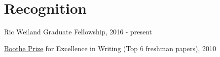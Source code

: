 \documentclass[letterpaper]{article}
\def\footerlink{}
\renewenvironment{itemize}{
  \begin{list}{}{
    \setlength{\leftmargin}{1.5em}
  }
}{
  \end{list}
}
\begin{document}
\section*{Recognition}
\begin{itemize}
\item Ric Weiland Graduate Fellowship, 2016 - present
\item \href{https://undergrad.stanford.edu/programs/pwr/publications-prizes-and-awards/boothe-prize-essays}{Boothe Prize} for Excellence in Writing (Top 6 freshman papers), 2010
\end{itemize}

\end{document}
